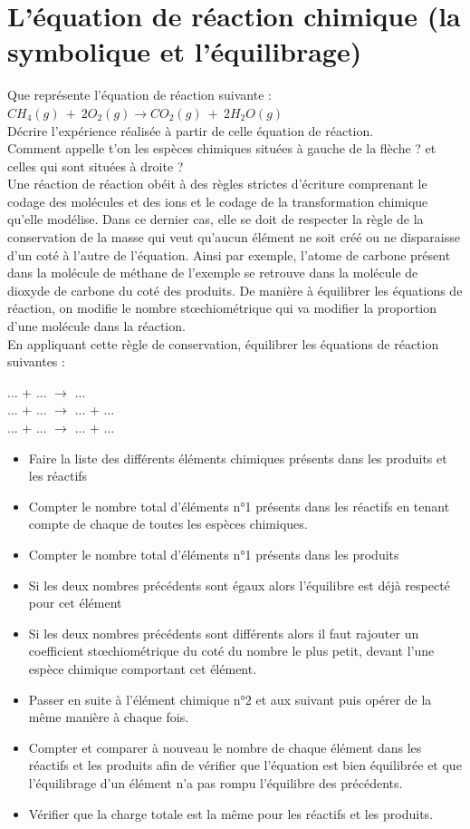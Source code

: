 \documentclass[a4paper,11pt,fleqn]{article}%
\begin{document}
\section{L'équation de réaction chimique (la symbolique et l'équilibrage)}
Que représente l’équation de réaction suivante : $CH_4(g)~+~2O_2(g) \rightarrow CO_2(g)~+~2H_2O(g)$\\
Décrire l’expérience réalisée à partir de celle équation de réaction.\\
Comment appelle t’on les espèces chimiques situées à gauche de la flèche ? et celles qui sont situées à droite ?\\
Une réaction de réaction obéit à des règles strictes d’écriture comprenant le codage des molécules et des ions et le codage de la transformation chimique qu’elle modélise. Dans ce dernier cas, elle se doit de respecter la règle de la conservation de la masse qui veut qu’aucun élément ne soit créé ou ne disparaisse d’un coté à l’autre de l’équation. Ainsi par exemple, l’atome de carbone présent dans la molécule de méthane de l’exemple se retrouve dans la molécule de dioxyde de carbone du coté des produits. De manière à équilibrer les équations de réaction, on modifie le nombre stœchiométrique qui va modifier la proportion d’une molécule dans la réaction.\\
En appliquant cette règle de conservation, équilibrer les équations de réaction suivantes :
\begin{center}
...  + ...  $\rightarrow$ ... \\
...  + ...  $\rightarrow$ ...  + ... \\
...  + ...  $\rightarrow$ ...  + ... 
\end{center}
\newpage
\begin{itemize}
	\item Faire la liste des différents éléments chimiques présents dans les produits et les réactifs 
    \item Compter le nombre total d’éléments n°1 présents dans les réactifs en tenant compte de chaque de toutes les espèces chimiques.
    \item Compter le nombre total d’éléments n°1 présents dans les produits
    \item Si les deux nombres précédents sont égaux alors l’équilibre est déjà respecté pour cet élément
    \item Si les deux nombres précédents sont différents alors il faut rajouter un coefficient stœchiométrique du coté du nombre le plus petit, devant l’une espèce chimique comportant cet élément.
    \item Passer en suite à l’élément chimique n°2 et aux suivant puis opérer de la même manière à chaque fois.
    \item Compter et comparer à nouveau le nombre de chaque élément dans les réactifs et les produits afin de vérifier que l’équation est bien équilibrée et que l’équilibrage d’un élément n’a pas rompu l’équilibre des précédents.
    \item Vérifier que la charge totale est la même pour les réactifs et les produits.
\end{itemize}
\end{document}

